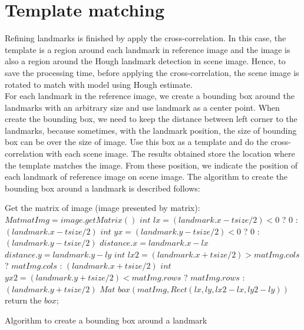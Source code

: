 \section{Template matching}
Refining landmarks is finished by apply the cross-correlation. In this case, the template is a region around each landmark in reference image and the image is also a region around the Hough landmark detection in scene image. Hence, to save the processing time, before applying the cross-correlation, the scene image is rotated to match with model using Hough estimate.\\[0.2cm]
For each landmark in the reference image, we create a bounding box around the landmarks with an arbitrary size and use landmark as a center point. When create the bounding box, we need to keep the distance between left corner to the landmarks, because sometimes, with the landmark position, the size of bounding box can be over the size of image. Use this box as a template and do the cross-correlation with each scene image. The results obtained store the location where the template matches the image. From these position, we indicate the position of each landmark of reference image on scene image. The algorithm to create the bounding box around a landmark is described follows:\\[0.2cm]
\begin{algorithm}[H]
\Indm 
{}
\SetAlgoLined
{}
\Indp
Get the matrix of image (image presented by matrix): $Mat matImg = image.getMatrix()$\;
$int$ $lx = (landmark.x - tsize/2) < 0$ ? $0$ : $(landmark.x - tsize/2)$\;
$int$ $yx = (landmark.y - tsize/2) < 0$ ? $0$ : $(landmark.y - tsize/2)$\;
$distance.x = landmark.x - lx$\;
$distance.y = landmark.y - ly$\;
$int$ $lx2 = (landmark.x + tsize/2) > matImg.cols$ ? $matImg.cols$ : $(landmark.x + tsize/2)$\;
$int$ $yx2 = (landmark.y + tsize/2) < matImg.rows$ ? $matImg.rows$ : $(landmark.y + tsize/2)$\;
$Mat$ $box(matImg,Rect(lx,ly,lx2 - lx, ly2 - ly))$\;
return the $box$;
\caption{Algorithm to create a bounding box around a landmark}
\end{algorithm}~\\[0.2cm]
